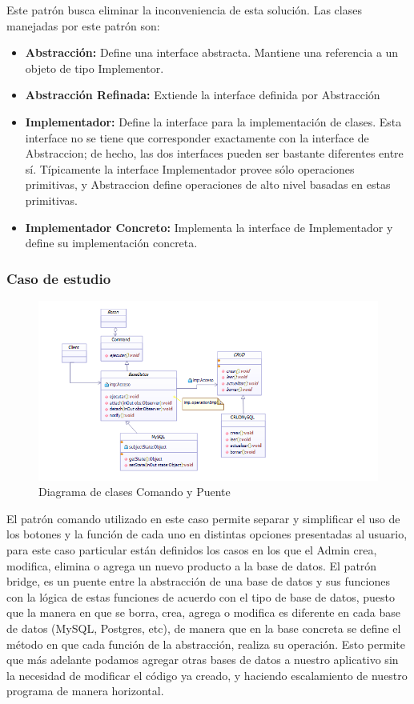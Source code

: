 Este patrón busca eliminar la inconveniencia de esta solución. Las clases manejadas por este patrón son:
\begin{itemize}
	\item \textbf{Abstracción: }Define una interface abstracta. Mantiene una referencia a un objeto de tipo Implementor.
	\item \textbf{Abstracción Refinada: }Extiende la interface definida por Abstracción 
	\item \textbf{Implementador: }Define la interface para la implementación de clases. Esta interface no se tiene que corresponder exactamente con la interface de Abstraccion; de hecho, las dos interfaces pueden ser bastante diferentes entre sí. Típicamente la interface Implementador provee sólo operaciones primitivas, y Abstraccion define operaciones de alto nivel basadas en estas primitivas.
	\item \textbf{Implementador Concreto: }Implementa la interface de Implementador y define su implementación concreta.
\end{itemize}

\subsubsection{Caso de estudio}

\begin{figure}[th!]
\centering
\includegraphics[width=1.0\linewidth]{arquitectura/imagenes/DiagramaComandoYPuente}
\caption{Diagrama de clases  Comando y Puente}
\end{figure}



El patrón comando utilizado en este caso permite separar y simplificar el uso de los botones y la función de cada uno en distintas opciones presentadas al usuario, para este caso particular están definidos los casos en los que el Admin crea, modifica, elimina o agrega un nuevo producto a la base de datos.
El patrón bridge, es un puente entre la abstracción de una base de datos y sus funciones con la lógica de estas funciones de acuerdo con el tipo de base de datos, puesto que la manera en que se borra, crea, agrega o modifica es diferente en cada base de datos (MySQL, Postgres, etc), de manera que en la base concreta se define el método en que cada función de la abstracción, realiza su operación. Esto permite que más adelante podamos agregar otras bases de datos a nuestro aplicativo sin la necesidad de modificar el código ya creado, y haciendo escalamiento de nuestro programa de manera horizontal.

